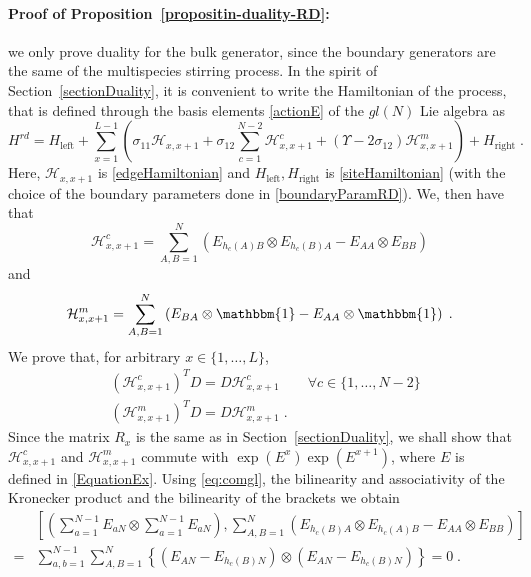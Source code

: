 \documentclass[10pt]{article}
\numberwithin{equation}{section}
\numberwithin{equation}{subsection}
\newcommand{\dt}{\;.}
\begin{document}
\paragraph{Proof of Proposition~\ref{propositin-duality-RD}:}
we only prove duality for the bulk generator, since the boundary generators are the same of the multispecies stirring process. In the spirit of Section~\ref{sectionDuality}, it is convenient to write the Hamiltonian of the process, that is defined through the basis elements \eqref{actionE} of the ${gl}(N)$ Lie algebra as 
\begin{equation}
	H^{rd}=H_{\text{left}}+\sum_{x=1}^{L-1}\left(\sigma_{11}\mathcal{H}_{x,x+1}+\sigma_{12}\sum_{c=1}^{N-2}\mathcal{H}_{x,x+1}^{c}+(\Upsilon-2\sigma_{12})\mathcal{H}_{x,x+1}^{m}\right)+H_{\text{right}}\dt
\end{equation}
Here, $\mathcal{H}_{x,x+1}$ is  \eqref{edgeHamiltonian}  and $H_{\text{left}},H_{\text{right}}$ is \eqref{siteHamiltonian} (with the choice of the boundary parameters done in \eqref{boundaryParamRD}). We, then have that 
\begin{equation}
	\mathcal{H}_{x,x+1}^{c}=\sum_{A,B=1}^{N}\left(E_{h_{c}(A)B}\otimes E_{h_{c}(B)A}-E_{AA}\otimes E_{BB}\right)
\end{equation}
and 
\begin{equation}
	\mathcal{H}_{x,x+1}^{m}=\sum_{A,B=1}^{N}\left(E_{BA}\otimes \mathbbm{1}-E_{AA}\otimes \mathbbm{1}\right)\dt
\end{equation}
We prove that, for arbitrary $x\in\{1,\ldots,L\}$,
\begin{align}
	&(\mathcal{H}_{x,x+1}^{c})^{T}D=D\mathcal{H}_{x,x+1}^{c}\qquad \forall c\in \{1,\ldots,N-2\}\label{cDualityRelation}\\
	&(\mathcal{H}_{x,x+1}^{m})^{T}D=D\mathcal{H}_{x,x+1}^{m}\label{mDualityRelation}\dt
\end{align}
Since the matrix $R_{x}$ is the same as in Section~\ref{sectionDuality}, we shall show that $\mathcal{H}_{x,x+1}^{c}$ and $\mathcal{H}_{x,x+1}^{m}$ commute with $\exp{(E^{x})}\exp{(E^{x+1})}$, where $E$ is defined in \eqref{EquationEx}. Using \eqref{eq:comgl}, the bilinearity and associativity of the Kronecker product and the bilinearity of the brackets we obtain 
\begin{align*}
	&\left[\left(\sum_{a=1}^{N-1}E_{aN}\otimes\sum_{a=1}^{N-1}E_{aN}\right), \sum_{A,B=1}^{N}\left(E_{h_{c}(B)A}\otimes E_{h_{c}(A)B} -E_{AA}\otimes E_{BB}\right)\right]
	\\=&
	\sum_{a,b=1}^{N-1}\sum_{A,B=1}^{N}\left\{\left(E_{AN}-E_{h_{c}(B)N}\right)\otimes \left(E_{AN}-E_{h_{c}(B)N}\right)\right\}=0\dt
\end{align*}
\end{document}
